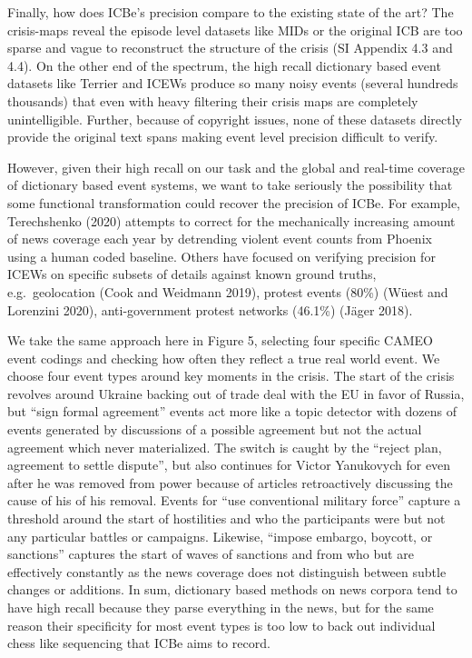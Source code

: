 \documentclass{article}
\begin{document}
Finally, how does ICBe's precision compare to the existing state of the
art? The crisis-maps reveal the episode level datasets like MIDs or the
original ICB are too sparse and vague to reconstruct the structure of
the crisis (SI Appendix 4.3 and 4.4). On the other end of the spectrum,
the high recall dictionary based event datasets like Terrier and ICEWs
produce so many noisy events (several hundreds thousands) that even with
heavy filtering their crisis maps are completely unintelligible.
Further, because of copyright issues, none of these datasets directly
provide the original text spans making event level precision difficult
to verify.

However, given their high recall on our task and the global and
real-time coverage of dictionary based event systems, we want to take
seriously the possibility that some functional transformation could
recover the precision of ICBe. For example, Terechshenko (2020) attempts
to correct for the mechanically increasing amount of news coverage each
year by detrending violent event counts from Phoenix using a human coded
baseline. Others have focused on verifying precision for ICEWs on
specific subsets of details against known ground truths,
e.g.~geolocation (Cook and Weidmann 2019), protest events (80\%) (Wüest
and Lorenzini 2020), anti-government protest networks (46.1\%) (Jäger
2018).

We take the same approach here in Figure 5, selecting four specific
CAMEO event codings and checking how often they reflect a true real
world event. We choose four event types around key moments in the
crisis. The start of the crisis revolves around Ukraine backing out of
trade deal with the EU in favor of Russia, but ``sign formal agreement''
events act more like a topic detector with dozens of events generated by
discussions of a possible agreement but not the actual agreement which
never materialized. The switch is caught by the ``reject plan, agreement
to settle dispute'', but also continues for Victor Yanukovych for even
after he was removed from power because of articles retroactively
discussing the cause of his of his removal. Events for ``use
conventional military force'' capture a threshold around the start of
hostilities and who the participants were but not any particular battles
or campaigns. Likewise, ``impose embargo, boycott, or sanctions''
captures the start of waves of sanctions and from who but are
effectively constantly as the news coverage does not distinguish between
subtle changes or additions. In sum, dictionary based methods on news
corpora tend to have high recall because they parse everything in the
news, but for the same reason their specificity for most event types is
too low to back out individual chess like sequencing that ICBe aims to
record.
\end{document}
